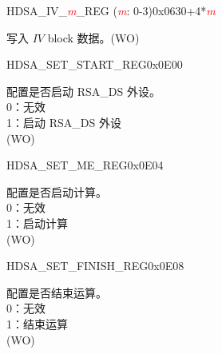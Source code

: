 


\begin{register}{H}{DSA\_IV\_\textcolor{red}{\it{m}}\_REG (\textcolor{red}{\it{m}}: 0-3)}{0x0630+4*\textcolor{red}{\it{m}}}\label{regdesc:DSAIVREG}
%
\regnewline%
\begin{regdesc}\begin{reglist}
\item [DSA\_IV\_\textcolor{red}{\it{m}}\_REG (\textcolor{red}{\it{m}}: 0-3)] 写入 \begin{math}IV\end{math} block 数据。(WO)
\end{reglist}\end{regdesc}
\end{register}


\begin{register}{H}{DSA\_SET\_START\_REG}{0x0E00}\label{regdesc:DSASETSTARTREG}
%
%
\regnewline%
\begin{regdesc}\begin{reglist}
\item [DSA\_SET\_START] 配置是否启动 RSA\_DS 外设。\\
0：无效\\
1：启动 RSA\_DS 外设\\
(WO)
\end{reglist}\end{regdesc}
\end{register}


\begin{register}{H}{DSA\_SET\_ME\_REG}{0x0E04}\label{regdesc:DSASETMEREG}
%
%
\regnewline%
\begin{regdesc}\begin{reglist}
\item [DSA\_SET\_ME] 配置是否启动计算。\\
0：无效\\
1：启动计算\\
(WO)
\end{reglist}\end{regdesc}
\end{register}


\begin{register}{H}{DSA\_SET\_FINISH\_REG}{0x0E08}\label{regdesc:DSASETFINISHREG}
%
%
\regnewline%
\begin{regdesc}\begin{reglist}
\item [DSA\_SET\_FINISH] 配置是否结束运算。\\
0：无效\\
1：结束运算\\
(WO)
\end{reglist}\end{regdesc}
\end{register}


